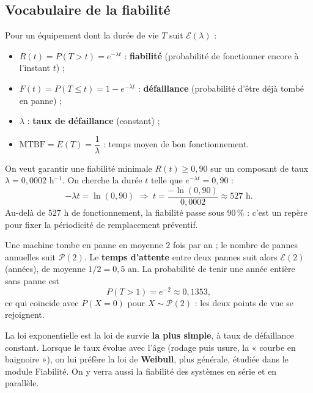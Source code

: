 \documentclass[a4paper,11pt]{article}
\begin{document}
\subsection{Vocabulaire de la fiabilité}

\begin{definition}
Pour un équipement dont la durée de vie $T$ suit $\mathcal{E}(\lambda)$ :
\begin{itemize}
  \item $R(t) = P(T > t) = e^{-\lambda t}$ : \textbf{fiabilité} (probabilité de fonctionner encore à l'instant $t$) ;
  \item $F(t) = P(T \leq t) = 1 - e^{-\lambda t}$ : \textbf{défaillance} (probabilité d'être déjà tombé en panne) ;
  \item $\lambda$ : \textbf{taux de défaillance} (constant) ;
  \item $\text{MTBF} = E(T) = \dfrac{1}{\lambda}$ : temps moyen de bon fonctionnement.
\end{itemize}
\end{definition}

\begin{appliindus}
On veut garantir une fiabilité minimale $R(t) \geq 0{,}90$ sur un composant de taux $\lambda = 0{,}0002$ h$^{-1}$. On cherche la durée $t$ telle que $e^{-\lambda t} = 0{,}90$ :
\[
-\lambda t = \ln(0{,}90) \;\Rightarrow\; t = \frac{-\ln(0{,}90)}{0{,}0002} \approx 527 \text{ h}.
\]
Au-delà de $527$ h de fonctionnement, la fiabilité passe sous $90\,\%$ : c'est un repère pour fixer la périodicité de remplacement préventif.
\end{appliindus}

\begin{exemple}
Une machine tombe en panne en moyenne $2$ fois par an ; le nombre de pannes annuelles suit $\mathcal{P}(2)$. Le \textbf{temps d'attente} entre deux pannes suit alors $\mathcal{E}(2)$ (années), de moyenne $1/2 = 0{,}5$ an. La probabilité de tenir une année entière sans panne est
\[
P(T > 1) = e^{-2} \approx 0{,}1353,
\]
ce qui coïncide avec $P(X = 0)$ pour $X \sim \mathcal{P}(2)$ : les deux points de vue se rejoignent.
\end{exemple}

\begin{remarque}
La loi exponentielle est la loi de survie \textbf{la plus simple}, à taux de défaillance constant. Lorsque le taux évolue avec l'âge (rodage puis usure, la « courbe en baignoire »), on lui préfère la loi de \textbf{Weibull}, plus générale, étudiée dans le module Fiabilité. On y verra aussi la fiabilité des systèmes en série et en parallèle.
\end{remarque}
\end{document}
